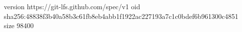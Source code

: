 version https://git-lfs.github.com/spec/v1
oid sha256:48838f3b40a58b3c61fb8eb4abb1f1922ac227193a7c1c0bdef6b961300c4851
size 98400
